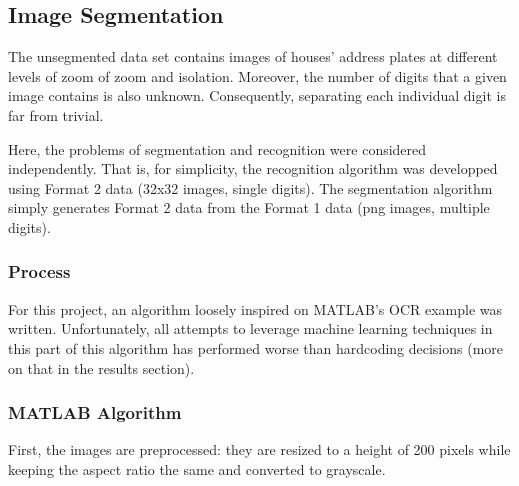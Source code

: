\documentclass{article} %
\begin{document}
\subsection{Image Segmentation}
The unsegmented data set contains images of houses' address plates at different levels of zoom of zoom and isolation. Moreover, the number of digits that a given image contains is also unknown. Consequently, separating each individual digit is far from trivial.

Here, the problems of segmentation and recognition were considered independently. That is, for simplicity, the recognition algorithm was developped using Format 2 data (32x32 images, single digits). The segmentation algorithm simply generates Format 2 data from the Format 1 data (png images, multiple digits).

\subsubsection{Process}
For this project, an algorithm loosely inspired on MATLAB's OCR example\cite{automaticdetect} was written. Unfortunately, all attempts to leverage machine learning techniques in this part of this algorithm has performed worse than hardcoding decisions (more on that in the results section).

\subsubsection{MATLAB Algorithm}
First, the images are preprocessed: they are resized to a height of 200 pixels while keeping the aspect ratio the same and converted to grayscale.
\end{document}
